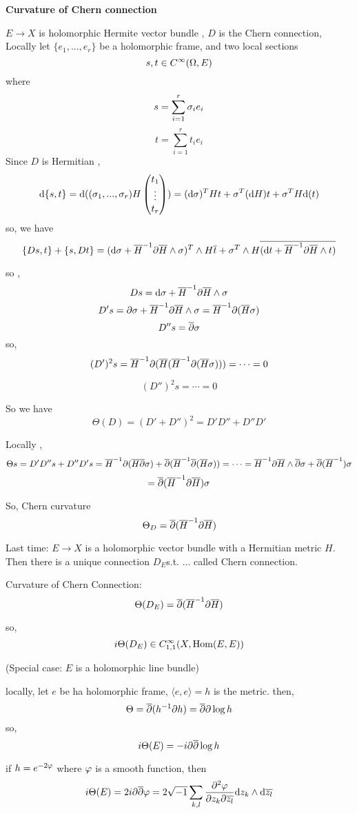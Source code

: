 \textbf{Curvature of Chern connection}

$E\to X$ is holomorphic Hermite vector bundle , $D$ is the Chern connection,
Locally let $\{e_1,...,e_r\}$ be a holomorphic frame, and two local sections
$$s,t\in C^\infty(\Omega, E)$$
where
$$s=\sum_{i=1}^r\sigma_ie_i$$
$$t=\sum_{i=1}^r t_ie_i$$
Since $D$ is Hermitian ,
$$\mathrm{d} \{s,t\}=\mathrm{d} ((\sigma_1,...,\sigma_r)H
\begin{pmatrix}
t_1\\
\vdots\\
t_r
\end{pmatrix})
=(\mathrm{d}\sigma)^THt+\sigma^T(\mathrm{d} H)t+\sigma^TH\mathrm{d}(t)
$$
so, we have
$$\{Ds,t\}+\{s,Dt\}=(\mathrm{d}\sigma+\overline{H}^{-1}\partial\overline{H}\wedge\sigma)^T\wedge H\overline{t}
+\sigma^T\wedge H\overline{(\mathrm{d} t+\overline{H}^{-1}\partial\overline{H}\wedge t)}$$

so ,
$$Ds=\mathrm{d}\sigma+\overline{H}^{-1}\partial\overline{H}\wedge\sigma$$
$$D's=\partial\sigma+\overline{H}^{-1}\partial\overline{H}\wedge\sigma
=\overline{H}^{-1}\partial(\overline{H}\sigma)$$
$$D''s=\overline{\partial}\sigma$$
so,
$$(D')^2s=\overline{H}^{-1}\partial(\overline{H}(\overline{H}^{-1}\partial(\overline{H}\sigma)))
=\cdots=0$$

$$(D'')^2s=\cdots=0$$

So we have
$$\Theta(D)=(D'+D'')^2=D'D''+D''D'$$

Locally ,
$$\Theta s=D'D''s+D''D's=\overline{H}^{-1}\partial(\overline{H}\overline{\partial}\sigma)
+\overline{\partial}(\overline{H}^{-1}\overline{\partial}(\overline{H}\sigma))
=\cdots=\overline{H}^{-1}\partial\overline{H}\wedge\overline{\partial}\sigma
+\overline{\partial}(\overline{H}^{-1})\sigma
$$
$$
  = \overline{\partial}(\overline{H}^{-1}\partial\overline{H})\sigma
$$

So, Chern curvature
$$\Theta_D=\overline{\partial}(\overline{H}^{-1}\partial\overline{H})$$


Last time: $E\to X$ is a holomorphic vector bundle 
with a Hermitian metric $H$.
Then there is a unique connection $D_E$s.t. ... called Chern connection.

Curvature of Chern Connection:
$$\Theta(D_E)=\overline{\partial}(\overline{H}^{-1}\partial\overline{H})$$

so,
$$i\Theta(D_E)\in C_{1,1}^\infty(X,\operatorname{Hom}(E,E))$$

\begin{example}(Special case: $E$ is  a holomorphic line bundle)

locally, let $e$ be ha holomorphic frame, 
$\langle e,e\rangle=h$ is the metric. 
then,
$$\Theta=\overline{\partial}(h^{-1}\partial h)=\overline{\partial}\partial\log h$$
so,
$$i\Theta(E)=-i\partial\overline{\partial}\log h$$
\end{example}
if $h=e^{-2\varphi}$ where $\varphi$ is a smooth function, then
$$i\Theta(E)=2i\partial\overline{\partial}\varphi
=2\sqrt{-1}\sum_{k,l}\frac{\partial^2{\varphi}} {\partial{z_k}\partial{\overline{z_l}}}
\mathrm{d} z_k\wedge\mathrm{d}\overline{z_l}
$$

